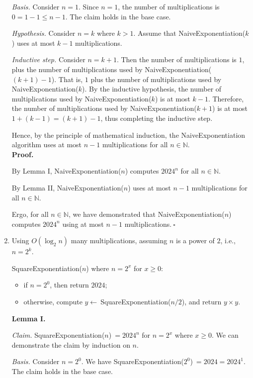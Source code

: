 \begin{enumerate}
\begin{solution}
\textit{Basis. }Consider $n=1$. Since $n=1$, the number of multiplications is $0=1-1\leq n-1$. The claim holds in the base case.

\textit{Hypothesis. }Consider $n=k$ where $k>1$. Assume that {\sc NaiveExponentiation}($k$) uses at most $k-1$ multiplications.

\textit{Inductive step. }Consider $n=k+1$. Then the number of multiplications is $1$, plus the number of multiplications used by {\sc NaiveExponentiation}($(k+1)-1$). That is, $1$ plus the number of multiplications used by {\sc NaiveExponentiation}($k$). By the inductive hypothesis, the number of multiplications used by {\sc NaiveExponentiation}($k$) is at most $k-1$. Therefore, the number of multiplications used by {\sc NaiveExponentiation}($k+1$) is at most $1+(k-1)=(k+1)-1$, thus completing the inductive step.

Hence, by the principle of mathematical induction, the {\sc NaiveExponentiation} algorithm uses at most $n-1$ multiplications for all $n\in\mathbb{N}$.\\

\textbf{Proof. }

By Lemma I, {\sc NaiveExponentiation}($n$) computes $2024^n$ for all $n\in\mathbb{N}$.

By Lemma II, {\sc NaiveExponentiation}($n$) uses at most $n-1$ multiplications for all $n\in\mathbb{N}$.

Ergo, for all $n\in\mathbb{N}$, we have demonstrated that {\sc NaiveExponentiation}($n$) computes $2024^n$ using at most $n-1$ multiplications.$~\square$
\end{solution}
\newpage
    \item Using $O(\log_2 n)$ many multiplications, assuming $n$ is a power of $2$, i.e., $n=2^k$.
\begin{solution}
{\sc SquareExponentiation}($n$) where $n=2^x$ for $x\geq 0$:
\begin{itemize}
\item if $n=2^0$, then return $2024$;
\item otherwise, compute $y\leftarrow~${\sc SquareExponentiation}($n/2$), and return $y\times y$.
\end{itemize}
\textbf{Lemma I. }

\textit{Claim. }{\sc SquareExponentiation}($n$)$~=2024^n$ for $n=2^x$ where $x\geq 0$. We can demonstrate the claim by induction on $n$.

\textit{Basis. }Consider $n=2^0$. We have {\sc SquareExponentiation}($2^0$)$~=2024=2024^1$. The claim holds in the base case.


\end{solution}
\end{enumerate}
